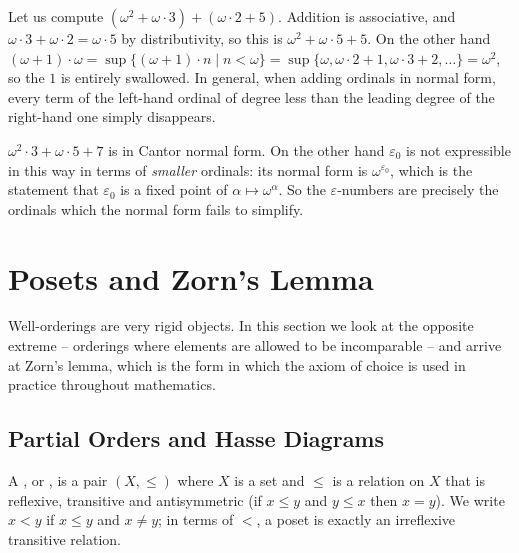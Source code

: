 \begin{example}
  Let us compute $(\omega^2 + \omega\cdot 3) + (\omega \cdot 2 + 5)$. Addition is associative, and $\omega\cdot 3 + \omega\cdot 2 = \omega\cdot 5$ by distributivity, so this is $\omega^2 + \omega\cdot 5 + 5$. On the other hand $(\omega + 1) \cdot \omega = \sup\{(\omega+1)\cdot n \mid n < \omega\} = \sup\{\omega, \omega\cdot 2 + 1, \omega \cdot 3 + 2, \dots\} = \omega^2$, so the $1$ is entirely swallowed. In general, when adding ordinals in normal form, every term of the left-hand ordinal of degree less than the leading degree of the right-hand one simply disappears.
\end{example}

\begin{example}
  $\omega^2 \cdot 3 + \omega \cdot 5 + 7$ is in Cantor normal form. On the other hand $\varepsilon_0$ is not expressible in this way in terms of \emph{smaller} ordinals: its normal form is $\omega^{\varepsilon_0}$, which is the statement that $\varepsilon_0$ is a fixed point of $\alpha \mapsto \omega^\alpha$. So the $\varepsilon$-numbers are precisely the ordinals which the normal form fails to simplify.
\end{example}

\section{Posets and Zorn's Lemma}\label{sec:zorn}

Well-orderings are very rigid objects. In this section we look at the opposite extreme -- orderings where elements are allowed to be incomparable -- and arrive at Zorn's lemma, which is the form in which the axiom of choice is used in practice throughout mathematics.

\subsection{Partial Orders and Hasse Diagrams}

\begin{definition}[Poset]
  A , or , is a pair $(X, \leq)$ where $X$ is a set and $\leq$ is a relation on $X$ that is reflexive, transitive and antisymmetric (if $x \leq y$ and $y \leq x$ then $x = y$). We write $x < y$ if $x \leq y$ and $x \neq y$; in terms of $<$, a poset is exactly an irreflexive transitive relation.
\end{definition}

